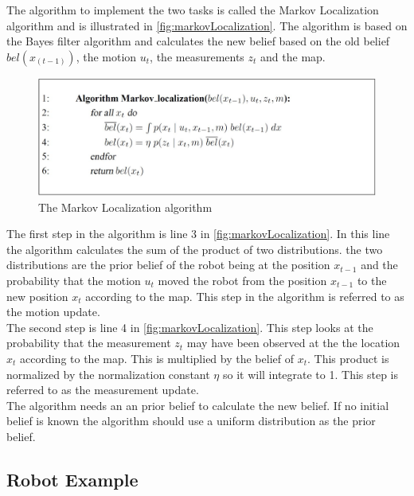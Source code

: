 The algorithm to implement the two tasks is called the Markov Localization algorithm and is illustrated in \autoref{fig:markovLocalization}. The algorithm is based on the Bayes filter algorithm and calculates the new belief based on the old belief $bel(x_{(t-1)})$, the motion $u_t$, the measurements $z_t$ and the map.

\begin{figure}[H]
\centering
\includegraphics[scale=0.25]{images/MarkovLocalization}
\caption{The Markov Localization algorithm}
\label{fig:markovLocalization}
\end{figure}

The first step in the algorithm is line 3 in \autoref{fig:markovLocalization}. In this line the algorithm calculates the sum of the product of two distributions. the two distributions are the prior belief of the robot being at the position $x_{t-1}$ and the probability that the motion $u_t$ moved the robot from the position $x_{t-1}$ to the new position $x_t$ according to the map. This step in the algorithm is referred to as the motion update. \\

The second step is line 4 in \autoref{fig:markovLocalization}. This step looks at the probability that the measurement $z_t$ may have been observed at the the location $x_t$ according to the map. This is multiplied by the belief of $x_t$. This product is normalized by the normalization constant $\eta$ so it will integrate to 1. This step is referred to as the measurement update.\\

The algorithm needs an an prior belief to calculate the new belief. If no initial belief is known the algorithm should use a uniform distribution as the prior belief.

\subsection{Robot Example} %
\label{sub:robot_example}

